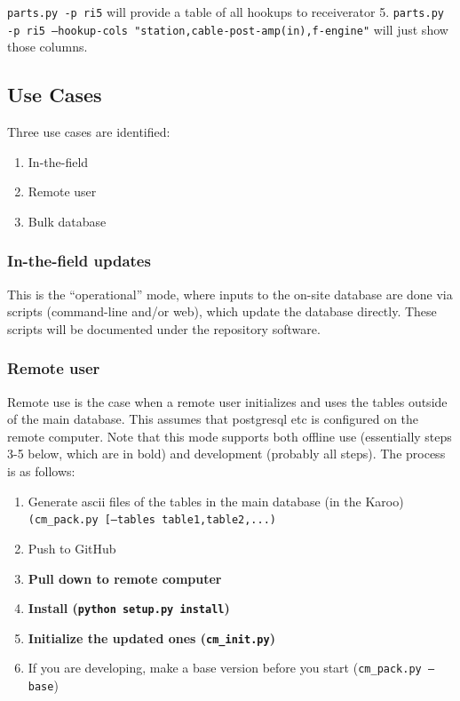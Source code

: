 \documentclass{article}
\begin{document}
{\tt parts.py -p ri5} will provide a table of all hookups to receiverator 5.  {\tt parts.py -p ri5 --hookup-cols "station,cable-post-amp(in),f-engine"}  will just show those columns.

\subsection{Use Cases}
	Three use cases are identified:
	\begin{enumerate}\setlength\itemsep{-.3em}
		\item In-the-field
		\item Remote user
		\item Bulk database
	\end{enumerate}

\subsubsection{In-the-field updates}
This is the ``operational'' mode, where inputs to the on-site database are done via scripts (command-line and/or web), which update the database directly.  These scripts will be documented under the repository software.

\subsubsection{Remote user}
Remote use is the case when a remote user initializes and uses the tables outside of the main database.  This assumes that postgresql etc is configured on the remote computer.  Note that this mode supports both offline use (essentially steps 3-5 below, which are in bold) and development (probably all steps).  The process is as follows: 
\begin{enumerate}\setlength\itemsep{-.3em}
	\item Generate ascii files of the tables in the main database (in the Karoo) {\tt (cm\_pack.py [--tables table1,table2,...)}
	\item Push to GitHub
	\item {\bf Pull down to remote computer}
	\item {\bf Install ({\tt python setup.py install})}
	\item {\bf Initialize the updated ones ({\tt cm\_init.py})}
	\item If you are developing, make a base version before you start ({\tt cm\_pack.py --base})
\end{enumerate}
\end{document}
